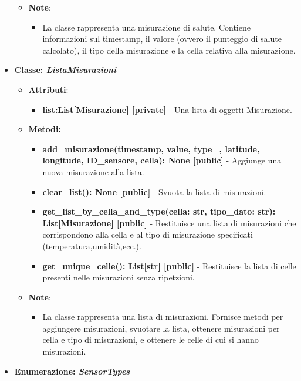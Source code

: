 \begin{itemize}
\begin{itemize}
    \item\textbf{Note}:
        \begin{itemize}
            \item La classe rappresenta una misurazione di salute. Contiene informazioni sul timestamp, il valore (ovvero il punteggio di salute calcolato), il tipo della misurazione e la cella relativa alla misurazione.
        \end{itemize}
    \end{itemize}
    \item\textbf{Classe: \textit{ListaMisurazioni}}
    \begin{itemize}
    \item\textbf{Attributi}:
        \begin{itemize}
        \item \textbf{list:List[Misurazione] [private]} - Una lista di oggetti Misurazione.
    \end{itemize}
    \item \textbf{Metodi: }
    \begin{itemize}
        \item \textbf{add\_misurazione(timestamp, value, type\_, latitude, longitude, ID\_sensore, cella): None [public]} - Aggiunge una nuova misurazione alla lista.
        \item \textbf{clear\_list(): None [public]} - Svuota la lista di misurazioni.
        \item \textbf{get\_list\_by\_cella\_and\_type(cella: str, tipo\_dato: str): List[Misurazione] [public]} - Restituisce una lista di misurazioni che corrispondono alla cella e al tipo di misurazione specificati (temperatura,umidità,ecc.).
        \item \textbf{get\_unique\_celle(): List[str] [public]} - Restituisce la lista di celle presenti nelle misurazioni senza ripetzioni.
    \end{itemize}
    \item\textbf{Note}:
        \begin{itemize}
            \item La classe rappresenta una lista di misurazioni. Fornisce metodi per aggiungere misurazioni, svuotare la lista, ottenere misurazioni per cella e tipo di misurazioni, e ottenere le celle di cui si hanno misurazioni.
        \end{itemize}
    \end{itemize}
    \item\textbf{Enumerazione: \textit{SensorTypes}}
        \begin{itemize}

\end{itemize}
\end{itemize}
